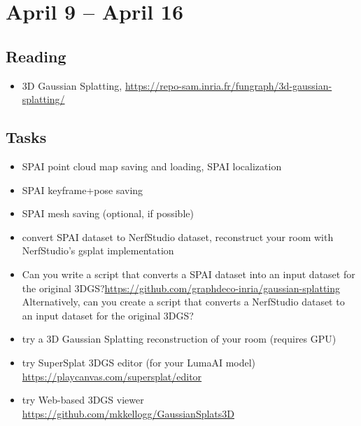 \documentclass{article}
\begin{document}
\newpage

\section{April 9 -- April 16}
\subsection{Reading}
\begin{itemize}
\item 3D Gaussian Splatting, \url{https://repo-sam.inria.fr/fungraph/3d-gaussian-splatting/}
\end{itemize}

\subsection{Tasks}
\begin{itemize}
\item SPAI point cloud map saving and loading, SPAI localization 
\item SPAI keyframe+pose saving 
\item SPAI mesh saving (optional, if possible) 
\item convert SPAI dataset to NerfStudio dataset, reconstruct your room with NerfStudio's gsplat implementation 
\item Can you write a script that converts a SPAI dataset into an input dataset for the original 3DGS?\url{https://github.com/graphdeco-inria/gaussian-splatting} Alternatively, can you create a script that converts a NerfStudio dataset to an input dataset for the original 3DGS?
\item try a 3D Gaussian Splatting reconstruction of your room (requires GPU) 
\item try SuperSplat 3DGS editor (for your LumaAI model) \url{https://playcanvas.com/supersplat/editor} 
\item try Web-based 3DGS viewer \url{https://github.com/mkkellogg/GaussianSplats3D} 
\end{itemize}
\end{document}
